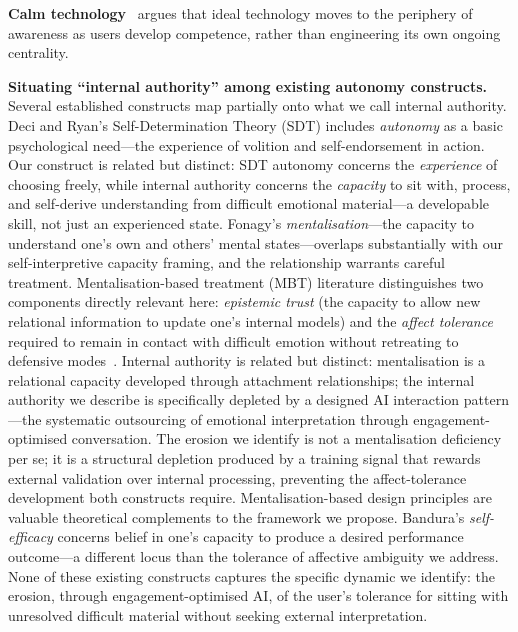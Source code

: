 \documentclass[sigchi,review,anonymous]{acmart}
\begin{document}
\textbf{Calm technology}~\cite{weiser1996} argues that ideal technology moves to the
periphery of awareness as users develop competence, rather than engineering its own ongoing
centrality.

\textbf{Situating ``internal authority'' among existing autonomy constructs.}
Several established constructs map partially onto what we call internal authority.
Deci and Ryan's Self-Determination Theory (SDT) includes \emph{autonomy} as a basic
psychological need---the experience of volition and self-endorsement in action. Our
construct is related but distinct: SDT autonomy concerns the \emph{experience} of choosing
freely, while internal authority concerns the \emph{capacity} to sit with, process, and
self-derive understanding from difficult emotional material---a developable skill, not just
an experienced state. Fonagy's \emph{mentalisation}---the capacity to understand one's own and others' mental
states---overlaps substantially with our self-interpretive capacity framing, and the
relationship warrants careful treatment. Mentalisation-based treatment (MBT) literature
distinguishes two components directly relevant here: \emph{epistemic trust} (the capacity
to allow new relational information to update one's internal models) and the
\emph{affect tolerance} required to remain in contact with difficult emotion without
retreating to defensive modes~\cite{allen2008mentalizing}. Internal authority is related
but distinct: mentalisation is a relational capacity developed through attachment
relationships; the internal authority we describe is specifically depleted by a designed
AI interaction pattern---the systematic outsourcing of emotional interpretation through
engagement-optimised conversation. The erosion we identify is not a mentalisation
deficiency per se; it is a structural depletion produced by a training signal that rewards
external validation over internal processing, preventing the affect-tolerance development
both constructs require. Mentalisation-based design principles are valuable theoretical
complements to the framework we propose. Bandura's \emph{self-efficacy} concerns
belief in one's capacity to produce a desired performance outcome---a different locus than
the tolerance of affective ambiguity we address. None of these existing constructs captures
the specific dynamic we identify: the erosion, through engagement-optimised AI, of the
user's tolerance for sitting with unresolved difficult material without seeking external
interpretation.
\end{document}
